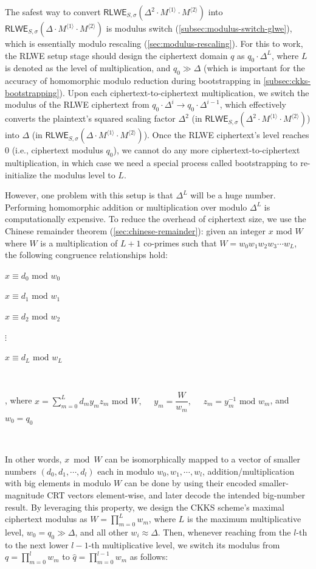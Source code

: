 The safest way to convert $\textsf{RLWE}_{S, \sigma}(\Delta^2 \cdot M^{\langle 1 \rangle} \cdot M^{\langle 2 \rangle})$ into $\textsf{RLWE}_{S, \sigma}(\Delta \cdot M^{\langle 1 \rangle} \cdot M^{\langle 2 \rangle})$ is modulus switch (\autoref{subsec:modulus-switch-glwe}), which is essentially modulo rescaling (\autoref{sec:modulus-rescaling}). For this to work, the RLWE setup stage should design the ciphertext domain $q$ as $q_0\cdot\Delta^{L}$, where $L$ is denoted as the level of multiplication, and $q_0 \gg \Delta$ (which is important for the accuracy of homomorphic modulo reduction during bootstrapping in \autoref{subsec:ckks-bootstrapping}). Upon each ciphertext-to-ciphertext multiplication, we switch the modulus of the RLWE ciphertext from $q_0\cdot\Delta^{i} \rightarrow q_0\cdot\Delta^{i-1}$, which effectively converts the plaintext's squared scaling factor $\Delta^2$ (in $\textsf{RLWE}_{S, \sigma}(\Delta^2 \cdot M^{\langle 1 \rangle} \cdot M^{\langle 2 \rangle})$) into $\Delta$ (in $\textsf{RLWE}_{S, \sigma}(\Delta \cdot M^{\langle 1 \rangle} \cdot M^{\langle 2 \rangle})$). Once the RLWE ciphertext's level reaches 0 (i.e., ciphertext modulus $q_0$), we cannot do any more ciphertext-to-ciphertext multiplication, in which case we need a special process called bootstrapping to re-initialize the modulus level to $L$. 

However, one problem with this setup is that $\Delta^L$ will be a huge number. Performing homomorphic addition or multiplication over modulo $\Delta^L$ is computationally expensive. To reduce the overhead of ciphertext size, we use the Chinese remainder theorem (\autoref{sec:chinese-remainder}): given an integer $x \text{ mod } W$ where $W$ is a multiplication of $L+1$ co-primes such that $W = w_0w_1w_2w_3\cdots w_L$, the following congruence relationships hold:

$x \equiv d_0 \text{ mod } w_0$ 

$x \equiv d_1 \text{ mod } w_1$ 

$x \equiv d_2 \text{ mod } w_2$ 

$\vdots$

$x \equiv d_L \text{ mod } w_L$ 

$ $

, where $x = \sum\limits_{m=0}^{L} d_my_mz_m \text{ mod } W, \text{ } \text{ } y_m = \dfrac{W}{w_m}, \text{ } \text{ } z_m = y_m^{-1} \text{ mod } w_m$, and $w_0 = q_0$ 

$ $

In other words, $x \bmod W$ can be isomorphically mapped to a vector of smaller numbers $(d_0, d_1, \cdots, d_l)$ each in modulo $w_0, w_1, \cdots, w_l$, addition/multiplication with big elements in modulo $W$ can be done by using their encoded smaller-magnitude CRT vectors element-wise, and later decode the intended big-number result. By leveraging this property, we design the CKKS scheme's maximal ciphertext modulus as $W= \prod\limits_{m=0}^{L}w_m$, where $L$ is the maximum multiplicative level, $w_0 = q_0 \gg \Delta$, and all other $w_i \approx \Delta$. Then, whenever reaching from the $l$-th to the next lower $l-1$-th multiplicative level, we switch its modulus from $q=\prod\limits_{m=0}^{l}w_m$ to $\hat q =\prod\limits_{m=0}^{l - 1}w_m$ as follows:

